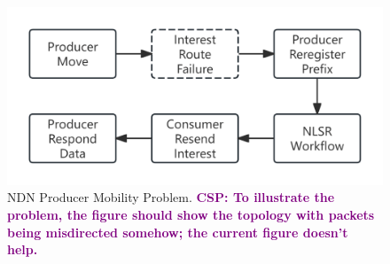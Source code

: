 \documentclass[10pt,conference]{IEEEtran}
\newcommand{\csp}[1]{\textbf{\textcolor{purple}{CSP: #1}}}
\begin{document}
\begin{figure}[t]
    \centering
    \includegraphics[width=1\linewidth]{figures/NDN_Producer_Mobility_Problem.pdf}
    \caption{NDN Producer Mobility Problem. \csp{To illustrate the problem, the figure should show the topology with packets being misdirected somehow; the current figure doesn't help.}}
    \label{fig:NDN Producer Mobility Problem}
\end{figure}
\end{document}
